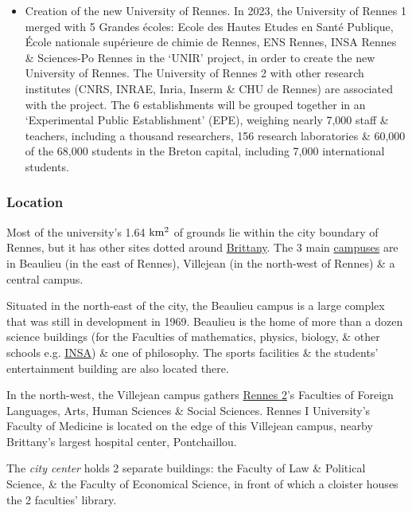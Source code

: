 \documentclass{article}
\begin{document}
\begin{itemize}
	\item {\sf Creation of the new University of Rennes.} In 2023, the University of Rennes 1 merged with 5 Grandes écoles: Ecole des Hautes Etudes en Santé Publique, École nationale supérieure de chimie de Rennes, ENS Rennes, INSA Rennes \& Sciences-Po Rennes in the `UNIR' project, in order to create the new University of Rennes. The University of Rennes 2 with other research institutes (CNRS, INRAE, Inria, Inserm \& CHU de Rennes) are associated with the project. The 6 establishments will be grouped together in an `Experimental Public Establishment' (EPE), weighing nearly 7,000 staff \& teachers, including a thousand researchers, 156 research laboratories \& 60,000 of the 68,000 students in the Breton capital, including 7,000 international students.
\end{itemize}

\subsubsection{Location}
Most of the university's 1.64 $\rm km^2$ of grounds lie within the city boundary of Rennes, but it has other sites dotted around \href{https://en.wikipedia.org/wiki/Brittany}{Brittany}. The 3 main \href{https://en.wikipedia.org/wiki/Campus}{campuses} are in Beaulieu (in the east of Rennes), Villejean (in the north-west of Rennes) \& a central campus.

Situated in the north-east of the city, the Beaulieu campus is a large complex that was still in development in 1969. Beaulieu is the home of more than a dozen science buildings (for the Faculties of mathematics, physics, biology, \& other schools e.g. \href{https://en.wikipedia.org/wiki/Institut_national_des_sciences_appliqu%C3%A9es_de_Rennes}{INSA}) \& one of philosophy. The sports facilities \& the students' entertainment building are also located there.

In the north-west, the Villejean campus gathers \href{https://en.wikipedia.org/wiki/University_of_Rennes_2_-_Upper_Brittany}{Rennes 2}'s Faculties of Foreign Languages, Arts, Human Sciences \& Social Sciences. Rennes I University's Faculty of Medicine is located on the edge of this Villejean campus, nearby Brittany's largest hospital center, Pontchaillou.

The {\it city center} holds 2 separate buildings: the Faculty of Law \& Political Science, \& the Faculty of Economical Science, in front of which a cloister houses the 2 faculties' library.
\end{document}
